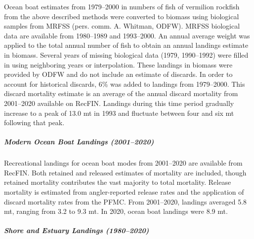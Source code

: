 \documentclass[11pt,
  english,
  a4paper,
]{article}
\begin{document}
\leavevmode\tagmcend\tagstructend\par


Ocean boat estimates from 1979--2000 in numbers of fish of vermilion rockfish from the above described methods were converted to biomass using biological samples from MRFSS (pers. comm. A. Whitman, ODFW). MRFSS biological data are available from 1980--1989 and 1993--2000. An annual average weight was applied to the total annual number of fish to obtain an annual landings estimate in biomass. Several years of missing biological data (1979, 1990--1992) were filled in using neighboring years or interpolation. These landings in biomass were provided by ODFW and do not include an estimate of discards. In order to account for historical discards, 6\% was added to landings from 1979--2000. This discard mortality estimate is an average of the annual discard mortality from 2001--2020 available on RecFIN. Landings during this time period gradually increase to a peak of 13.0 mt in 1993 and fluctuate between four and six mt following that peak.

\leavevmode\tagmcend\tagstructend\par


\hypertarget{modern-ocean-boat-landings-20012020}{%
\subparagraph{Modern Ocean Boat Landings (2001--2020)}\label{modern-ocean-boat-landings-20012020}}

\leavevmode\tagmcend\tagstructend


Recreational landings for ocean boat modes from 2001--2020 are available from RecFIN. Both retained and released estimates of mortality are included, though retained mortality contributes the vast majority to total mortality. Release mortality is estimated from angler-reported release rates and the application of discard mortality rates from the PFMC. From 2001--2020, landings averaged 5.8 mt, ranging from 3.2 to 9.3 mt. In 2020, ocean boat landings were 8.9 mt.

\leavevmode\tagmcend\tagstructend\par


\hypertarget{shore-and-estuary-landings-19802020}{%
\subparagraph{Shore and Estuary Landings (1980--2020)}\label{shore-and-estuary-landings-19802020}}
\end{document}
